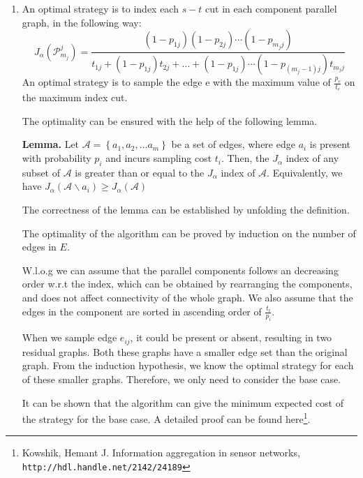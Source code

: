 \documentclass{oxmathproblems}
\begin{document}
\begin{enumerate}
{    Thus our strategy is optimal.
  }
  \item{ An optimal strategy is to index each $s-t$ cut in each component parallel graph, in the following way:
    $$
    J_{\alpha}\left(\mathcal{P}_{m_{j}}^{j}\right)=\frac{\left(1-p_{1 j}\right)\left(1-p_{2 j}\right) \cdots\left(1-p_{m_{j} j}\right)}{t_{1 j}+\left(1-p_{1 j}\right) t_{2 j}+\ldots+\left(1-p_{1 j}\right) \cdots\left(1-p_{\left(m_{j}-1\right) j}\right) t_{m_{j} j}}
    $$
    An optimal strategy is to sample the edge e with the maximum value of $\frac{p_{e}}{t_{e}}$ on the maximum index cut.

    The optimality can be ensured with the help of the following lemma.
    
    \textbf{Lemma.} Let $\mathcal{A}=\left\{a_{1}, a_{2}, \ldots a_{m}\right\}$ be a set of edges, where edge $a_{i}$ is present with probability $p_{i}$ and incurs sampling cost $t_{i} .$ Then, the $J_{\alpha}$ index of any subset of $\mathcal{A}$ is greater than or equal to the $J_{\alpha}$ index of $\mathcal{A} .$ Equivalently, we have $J_{\alpha}\left(\mathcal{A} \backslash a_{i}\right) \geq J_{\alpha}(\mathcal{A})$

    The correctness of the lemma can be established by unfolding the definition.

    The optimality of the algorithm can be proved by induction on the number of edges in $E$.
    
    W.l.o.g we can assume that the parallel components follows an decreasing order w.r.t the index, which can be obtained by rearranging the components, and does not affect connectivity of the whole graph. We also assume that the edges in the component are sorted in ascending order of $\frac{t_i}{p_i}$.
    
    When we sample edge $e_{ij}$, it could be present or absent, resulting in two residual graphs. Both these graphs have a smaller edge set than the original graph. From the induction hypothesis, we know the optimal strategy for each of these smaller graphs. Therefore, we only need to consider the base case.

    It can be shown that the algorithm can give the minimum expected cost of the strategy for the base case. A detailed proof can be found here\footnote{Kowshik, Hemant J. Information aggregation in sensor networks, \texttt{http://hdl.handle.net/2142/24189}}.



  }
\end{enumerate}
\end{document}
